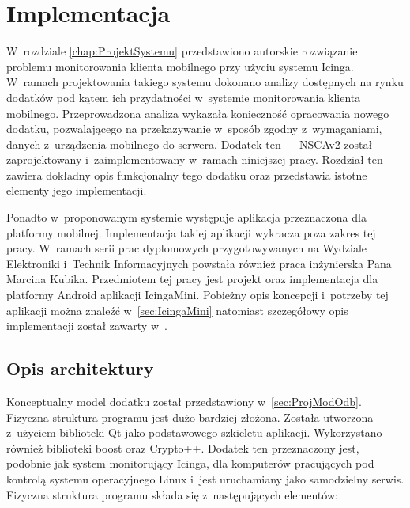 \chapter{Implementacja}
\label{chap:Implementacja}

W~rozdziale \ref{chap:ProjektSystemu} przedstawiono autorskie
rozwiązanie problemu monitorowania klienta mobilnego przy użyciu
systemu Icinga. W~ramach projektowania takiego systemu dokonano
analizy dostępnych na rynku dodatków pod kątem ich przydatności
w~systemie monitorowania klienta mobilnego. Przeprowadzona analiza
wykazała konieczność opracowania nowego dodatku, pozwalającego na
przekazywanie w~sposób zgodny z~wymaganiami, danych z~urządzenia
mobilnego do serwera.  Dodatek ten --- NSCAv2 został zaprojektowany
i~zaimplementowany w~ramach niniejszej pracy. Rozdział ten zawiera
dokładny opis funkcjonalny tego dodatku oraz przedstawia istotne
elementy jego implementacji.

Ponadto w~proponowanym systemie występuje aplikacja przeznaczona dla
platformy mobilnej. Implementacja takiej aplikacji wykracza poza
zakres tej pracy.  W~ramach serii prac dyplomowych przygotowywanych na
Wydziale Elektroniki i~Technik Informacyjnych powstała również praca
inżynierska Pana Marcina Kubika. Przedmiotem tej pracy jest projekt
oraz implementacja dla platformy Android aplikacji
IcingaMini. Pobieżny opis koncepcji i~potrzeby tej aplikacji można
znaleźć w~\ref{sec:IcingaMini} natomiast szczegółowy opis
implementacji został zawarty w~\cite{book:pracaKubika}.

\section[Opis architektury][Opis architektury]{Opis architektury}


Konceptualny model dodatku został przedstawiony
w~\ref{sec:ProjModOdb}. Fizyczna struktura programu jest dużo bardziej
złożona. Została utworzona z~użyciem biblioteki Qt jako podstawowego
szkieletu aplikacji. Wykorzystano również biblioteki boost oraz
Crypto++. Dodatek ten przeznaczony jest, podobnie jak system
monitorujący Icinga, dla komputerów pracujących pod kontrolą systemu
operacyjnego Linux i~jest uruchamiany jako samodzielny
serwis. Fizyczna struktura programu składa się z~następujących
elementów:

